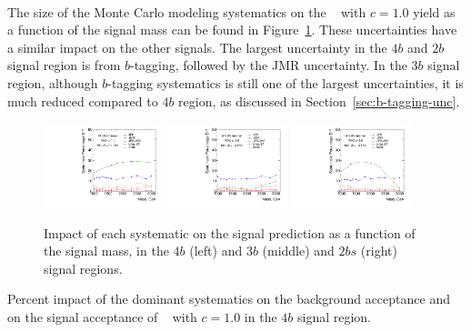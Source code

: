 \paragraph{}
The size of the Monte Carlo modeling systematics on the \Grav~ with $c=1.0$ yield as a function of the signal mass can be found in Figure~\ref{fig:signal_syst_summary}. 
These uncertainties have a similar impact on the other signals. 
The largest uncertainty in the $4b$ and $2b$ signal region is from $b$-tagging, followed by the JMR uncertainty.
In the $3b$ signal region, although $b$-tagging systematics is still one of the largest uncertainties, it is much reduced compared to $4b$ region, as discussed in Section~\ref{sec:b-tagging-unc}. 

\begin{figure}[htbp!]
\begin{center}
\includegraphics[width=0.31\textwidth,angle=-90]{figures/boosted/Syst_MC/FourTag_RSG_syst.pdf}
\includegraphics[width=0.31\textwidth,angle=-90]{figures/boosted/Syst_MC/ThreeTag_RSG_syst.pdf}
\includegraphics[width=0.31\textwidth,angle=-90]{figures/boosted/Syst_MC/TwoTag_split_RSG_syst.pdf}
\caption{Impact of each systematic on the signal prediction as a function of the signal mass, in the $4b$ (left) and $3b$ (middle) and $2bs$ (right) signal regions.}
\label{fig:signal_syst_summary}
\end{center}
\end{figure}

\begin{table}[htbp!]
\scriptsize
\begin{center}
\caption{Percent impact of the dominant systematics on the background acceptance
         and on the signal acceptance of \Grav~ with $c=1.0$ in the $4b$ signal region.}

\label{tab:summary-systematics-4b}
\end{center}
\end{table}

